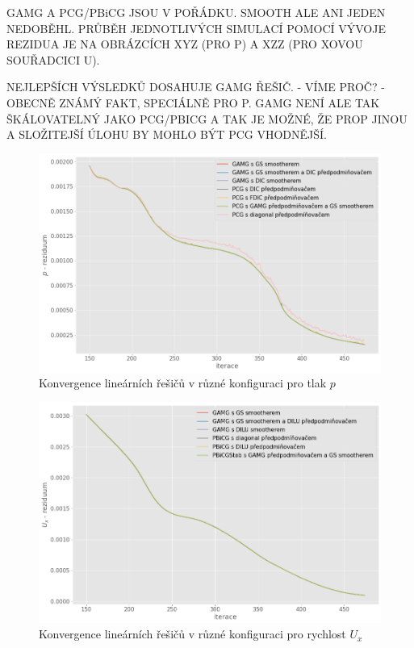 \documentclass[a4paper,12pt]{report}
\theoremstyle{remark}
\begin{document}
GAMG A PCG/PBiCG JSOU V POŘÁDKU. SMOOTH ALE ANI JEDEN NEDOBĚHL. PRŮBĚH JEDNOTLIVÝCH SIMULACÍ POMOCÍ VÝVOJE REZIDUA JE NA OBRÁZCÍCH XYZ (PRO P) A XZZ (PRO XOVOU SOUŘADCICI U). 

NEJLEPŠÍCH VÝSLEDKŮ DOSAHUJE GAMG ŘEŠIČ. - VÍME PROČ? - OBECNĚ ZNÁMÝ FAKT, SPECIÁLNĚ PRO P. GAMG NENÍ ALE TAK ŠKÁLOVATELNÝ JAKO PCG/PBICG A TAK JE MOŽNÉ, ŽE PROP JINOU A SLOŽITEJŠÍ ÚLOHU BY MOHLO BÝT PCG VHODNĚJŠÍ.

\begin{figure}[H]
	\centering
	\includegraphics[width=1\linewidth]{p-residuum.png}
	\caption{Konvergence lineárních řešičů v různé konfiguraci pro tlak $p$}
	\label{fig:p-residuum}
\end{figure}


\begin{figure}[H]
	\centering
	\includegraphics[width=1\linewidth]{ux-residuum.png}
	\caption{Konvergence lineárních řešičů v různé konfiguraci pro rychlost $U_x$}
	\label{fig:ux-residuum}
\end{figure}
\end{document}
